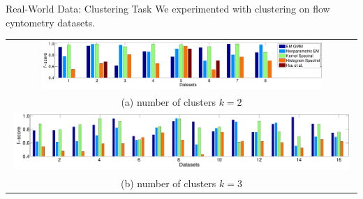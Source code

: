 \documentclass[final,t]{beamer}
\begin{document}
\begin{frame}{}
\begin{columns}[t]
\begin{column}{0.3\linewidth}
    \begin{block}{Real-World Data: Clustering Task}
      We experimented with clustering on flow cyntometry datasets. %
      \begin{center}
      \begin{tabular}{c}
        \includegraphics[width=0.82\textwidth]{../experiment/figure_new/paired_bar_chat_k_2} \\[-2mm]
        (a) number of clusters $k=2$ \\[-1mm]
        \includegraphics[width=0.98\textwidth]{../experiment/figure_new/paired_bar_chat_k_3}  \\[-2mm]
        (b) number of clusters $k=3$
      \end{tabular}
      \vspace{-4mm}
      \caption{Clustering results on the DLBCL flow cytometry datasets.}
      \vspace{-3mm}
      \end{center}
    \end{block}
    \end{column}

  \end{columns}
\end{frame}
\end{document}
